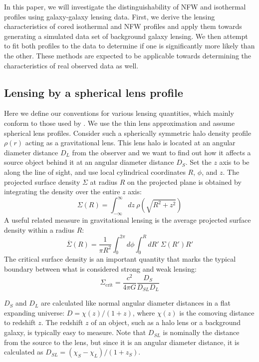 \documentclass[10pt]{article}
\begin{document}
In this paper, we will investigate the distinguishability of NFW and isothermal profiles using galaxy-galaxy lensing data. First, we derive the lensing characteristics of cored isothermal and NFW profiles and apply them towards generating a simulated data set of background galaxy lensing. We then attempt to fit both profiles to the data to determine if one is significantly more likely than the other. These methods are expected to be applicable towards determining the characteristics of real observed data as well.


\subsection{Lensing by a spherical lens profile}
Here we define our conventions for various lensing quantities, which mainly conform to those used by \citet{Dodelson2017}. We use the thin lens approximation and assume spherical lens profiles. Consider such a spherically symmetric halo density profile $\rho(r)$ acting as a gravitational lens. This lens halo is located at an angular diameter distance $D_L$ from the observer and we want to find out how it affects a source object behind it at an angular diameter distance $D_S$. Set the $z$ axis to be along the line of sight, and use local cylindrical coordinates $R$, $\phi$, and $z$. The projected surface density $\Sigma$ at radius $R$ on the projected plane is obtained by integrating the density over the entire $z$ axis:
\begin{equation} \label{sigma}
\Sigma(R) = \int_{-\infty}^{\infty}{dz\ \rho(\sqrt{R^2 + z^2})}
\end{equation}
A useful related measure in gravitational lensing is the average projected surface density within a radius $R$:
\begin{equation} \label{sigmabar}
\overline{\Sigma}(R) = \frac{1}{\pi R^2} \int_0^{2\pi}{d\phi \int_0^{R}{dR'~\Sigma(R')R'}}
\end{equation}
The critical surface density is an important quantity that marks the typical boundary between what is considered strong and weak lensing:
\begin{equation} \label{sigmacrit}
\Sigma_\mathrm{crit} = \frac{c^2}{4\pi G} \frac{D_S}{D_{SL} D_L}
\end{equation}

$D_S$ and $D_L$ are calculated like normal angular diameter distances in a flat expanding universe: $D = \chi(z)/(1 + z)$, where $\chi(z)$ is the comoving distance to redshift $z$. The redshift $z$ of an object, such as a halo lens or a background galaxy, is typically easy to measure. Note that $D_{SL}$ is nominally the distance from the source to the lens, but since it is an angular diameter distance, it is calculated as $D_{SL} = (\chi_S - \chi_L)/(1 + z_S)$.
\end{document}
